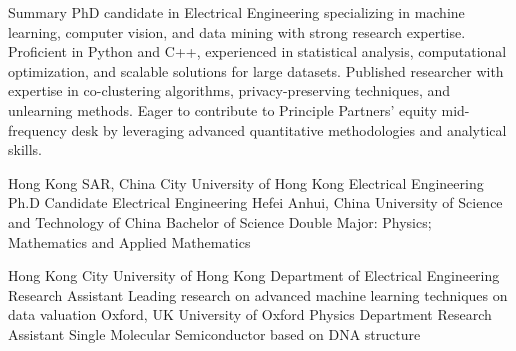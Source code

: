 \documentclass[caps, english]{financecv}
\begin{document}
\begin{cvsection}{Summary}
    PhD candidate in Electrical Engineering specializing in machine learning, computer vision, and data mining with strong research expertise. Proficient in Python and C++, experienced in statistical analysis, computational optimization, and scalable solutions for large datasets. Published researcher with expertise in co-clustering algorithms, privacy-preserving techniques, and unlearning methods. Eager to contribute to Principle Partners' equity mid-frequency desk by leveraging advanced quantitative methodologies and analytical skills.
\end{cvsection}
\education
{}
{Hong Kong SAR, China}
{City University of Hong Kong}
{Electrical Engineering}
{Ph.D Candidate}
{Electrical Engineering}
{}
{}
{Hefei Anhui, China}
{University of Science and Technology of China}
{}
{Bachelor of Science}
{Double Major: Physics; Mathematics and Applied Mathematics}
{}
{}

\experience
{}
{Hong Kong}
{City University of Hong Kong}
{Department of Electrical Engineering}
{Research Assistant}
{Leading research on advanced machine learning techniques on data valuation}
{}
{}
{Oxford, UK}
{University of Oxford}
{Physics Department}
{Research Assistant}
{Single Molecular Semiconductor based on DNA structure}
{}
{}
\end{document}
